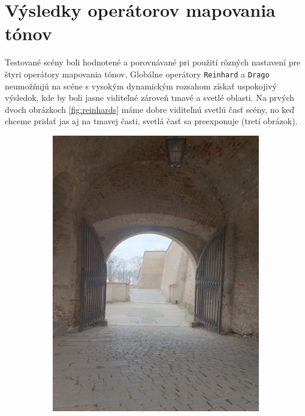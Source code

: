 \section{Výsledky operátorov mapovania tónov}

Testované scény boli hodnotené a porovnávané pri použití rôzných nastavení pre štyri operátory mapovania tónov.
Globálne operátory \texttt{Reinhard} a \texttt{Drago} neumožňujú na scéne s vysokým dynamickým rozsahom získať uspokojivý
výsledok, kde by boli jasne viditeľné zároveň tmavé a svetlé oblasti. Na prvých dvoch obrázkoch \ref{fig:reinhards}
máme dobre viditeľnú svetlú časť scény, no keď chceme pridať jas aj na tmavej časti, svetlá časť sa preexponuje
(tretí obrázok).

\begin{figure}[h!]
  \centering
  \begin{subfigure}{0.3\textwidth}
      \includegraphics[width=\textwidth]{figures/tests/tmo/rein1}
  \end{subfigure}

\end{figure}
